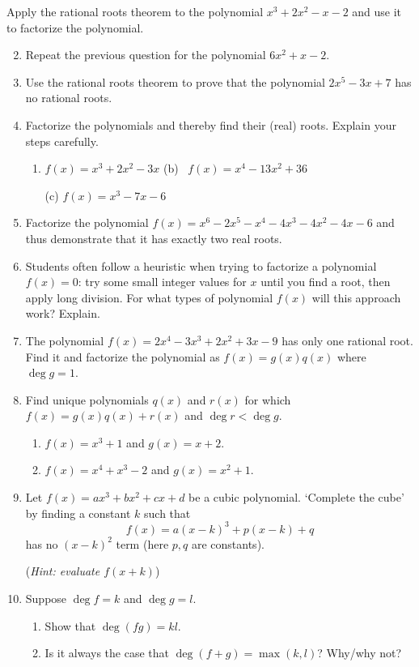 \begin{exercises}{}{}
	\exstart Apply the rational roots theorem to the polynomial $x^3+2x^2-x-2$ and use it to factorize the polynomial.
	\begin{enumerate}\setcounter{enumi}{1}
	  \item Repeat the previous question for the polynomial $6x^2+x-2$.
	
		\item Use the rational roots theorem to prove that the polynomial $2x^5-3x+7$ has no rational roots.
	  
	  \item Factorize the polynomials and thereby find their (real) roots. Explain your steps carefully.
	  \begin{enumerate}
	    \item $f(x)=x^3+2x^2-3x$ %
	    \qquad\qquad\qquad
	    (b) \ $f(x)=x^4-13x^2+36$ %
	    \item[(c)] $f(x)=x^3-7x-6$ %
	  \end{enumerate}
	  
	  
	  \item Factorize the polynomial $f(x)=x^6-2x^5-x^4-4x^3-4x^2-4x-6$ %
	  and thus demonstrate that it has exactly two real roots.
	  
	  
	  \item Students often follow a heuristic when trying to factorize a polynomial $f(x)=0$: try some small integer values for $x$ until you find a root, then apply long division. For what types of polynomial $f(x)$ will this approach work? Explain.
	  
		
		\item The polynomial $f(x)=2x^4-3x^3+2x^2+3x-9$ has only one rational root. Find it and factorize the polynomial as $f(x)=g(x)q(x)$ where $\deg g=1$.
		
		
		\item Find unique polynomials $q(x)$ and $r(x)$ for which $f(x)=g(x)q(x)+r(x)$ and $\deg r<\deg g$.
		\begin{enumerate}
		  \item $f(x)=x^3+1$ and $g(x)=x+2$.
		  \item	$f(x)=x^4+x^3-2$ and $g(x)=x^2+1$.
		\end{enumerate}  
	
	
	  \item Let $f(x)=ax^3+bx^2+cx+d$ be a cubic polynomial. `Complete the cube' by finding a constant $k$ such that
	  \[
	  	f(x)=a(x-k)^3+p(x-k)+q
	  \]
	  has no $(x-k)^2$ term (here $p,q$ are constants).\par
	  (\emph{Hint: evaluate $f(x+k)$})
	  
	  
	  \item Suppose $\deg f=k$ and $\deg g=l$.
	  \begin{enumerate}
	    \item Show that $\deg(fg)=kl$.
	    \item Is it always the case that $\deg(f+g)=\max(k,l)$? Why/why not?
	  \end{enumerate}
	\end{enumerate}
\end{exercises}

